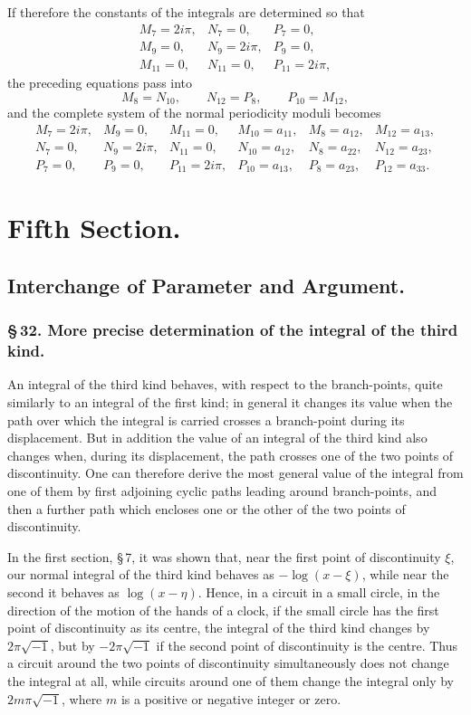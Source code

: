 \documentclass[10pt]{article}
\begin{document}
If therefore the constants of the integrals are determined so that
\[
\begin{array}{lll}
M_7=2i\pi,&N_7=0,&P_7=0,\\
M_9=0,&N_9=2i\pi,&P_9=0,\\
M_{11}=0,&N_{11}=0,&P_{11}=2i\pi,
\end{array}
\]
the preceding equations pass into
\[
M_8=N_{10},\qquad N_{12}=P_8,\qquad P_{10}=M_{12},
\]
and the complete system of the normal periodicity moduli becomes
\[
\begin{array}{llllll}
M_7=2i\pi,&M_9=0,&M_{11}=0,&M_{10}=a_{11},&M_8=a_{12},&M_{12}=a_{13},\\
N_7=0,&N_9=2i\pi,&N_{11}=0,&N_{10}=a_{12},&N_8=a_{22},&N_{12}=a_{23},\\
P_7=0,&P_9=0,&P_{11}=2i\pi,&P_{10}=a_{13},&P_8=a_{23},&P_{12}=a_{33}.
\end{array}
\]


\section*{Fifth Section.}
\subsection*{Interchange of Parameter and Argument.}

\subsubsection*{\S\,32. More precise determination of the integral of the third kind.}

An integral of the third kind behaves, with respect to the branch-points, quite similarly to an integral of the first kind; in general it changes its value when the path over which the integral is carried crosses a branch-point during its displacement. But in addition the value of an integral of the third kind also changes when, during its displacement, the path crosses one of the two points of discontinuity. One can therefore derive the most general value of the integral from one of them by first adjoining cyclic paths leading around branch-points, and then a further path which encloses one or the other of the two points of discontinuity.

In the first section, \S\,7, it was shown that, near the first point of discontinuity \(\xi\), our normal integral of the third kind behaves as \(-\log(x-\xi)\), while near the second it behaves as \(\log(x-\eta)\). Hence, in a circuit in a small circle, in the direction of the motion of the hands of a clock, if the small circle has the first point of discontinuity as its centre, the integral of the third kind changes by \(2\pi\sqrt{-1}\), but by \(-2\pi\sqrt{-1}\) if the second point of discontinuity is the centre. Thus a circuit around the two points of discontinuity simultaneously does not change the integral at all, while circuits around one of them change the integral only by \(2m\pi\sqrt{-1}\), where \(m\) is a positive or negative integer or zero.
\end{document}
